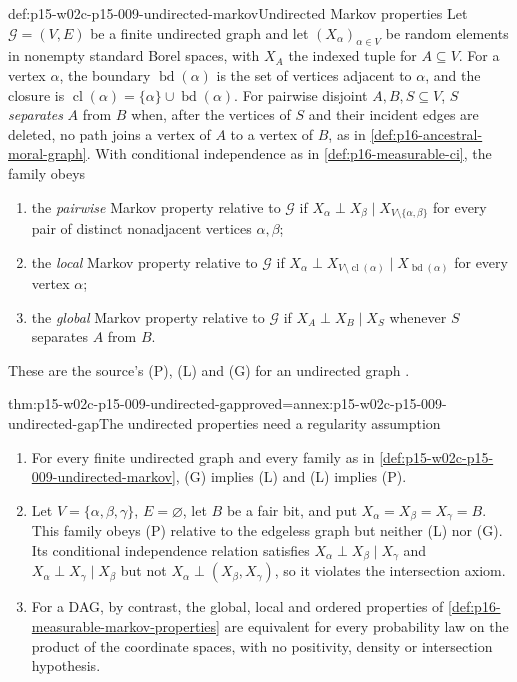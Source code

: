 \begin{hbdefinition}{def:p15-w02c-p15-009-undirected-markov}{Undirected Markov properties}
Let \(\mathcal G=(V,E)\) be a finite undirected graph and let
\((X_\alpha)_{\alpha\in V}\) be random elements in nonempty standard
Borel spaces, with \(X_A\) the indexed tuple for \(A\subseteq V\). For a
vertex \(\alpha\), the boundary \(\operatorname{bd}(\alpha)\) is the set
of vertices adjacent to \(\alpha\), and the closure is
\(\operatorname{cl}(\alpha)=\{\alpha\}\cup\operatorname{bd}(\alpha)\).
For pairwise disjoint \(A,B,S\subseteq V\), \(S\) \emph{separates}
\(A\) from \(B\) when, after the vertices of \(S\) and their incident
edges are deleted, no path joins a vertex of \(A\) to a vertex of \(B\),
as in \cref{def:p16-ancestral-moral-graph}. With conditional independence
as in \cref{def:p16-measurable-ci}, the family obeys
\begin{enumerate}
\item[(P)] the \emph{pairwise} Markov property relative to \(\mathcal G\)
  if \(X_\alpha\perp X_\beta\mid X_{V\setminus\{\alpha,\beta\}}\) for every
  pair of distinct nonadjacent vertices \(\alpha,\beta\);
\item[(L)] the \emph{local} Markov property relative to \(\mathcal G\) if
  \(X_\alpha\perp X_{V\setminus\operatorname{cl}(\alpha)}
  \mid X_{\operatorname{bd}(\alpha)}\) for every vertex \(\alpha\);
\item[(G)] the \emph{global} Markov property relative to \(\mathcal G\) if
  \(X_A\perp X_B\mid X_S\) whenever \(S\) separates \(A\) from \(B\).
\end{enumerate}
These are the source's (P), (L) and (G) for an undirected graph
\cite[Definition~2.35, p.~59; p.~60]{Lauritzen2019GraphicalLectures2020}.
\end{hbdefinition}

\begin{hbtheorem}{thm:p15-w02c-p15-009-undirected-gap}{proved=annex:p15-w02c-p15-009-undirected-gap}{The undirected properties need a regularity assumption}
\begin{enumerate}
\item For every finite undirected graph and every family as in
  \cref{def:p15-w02c-p15-009-undirected-markov}, (G) implies (L) and (L)
  implies (P).
\item Let \(V=\{\alpha,\beta,\gamma\}\), \(E=\varnothing\), let \(B\) be
  a fair bit, and put \(X_\alpha=X_\beta=X_\gamma=B\). This family obeys
  (P) relative to the edgeless graph but neither (L) nor (G). Its
  conditional independence relation satisfies
  \(X_\alpha\perp X_\beta\mid X_\gamma\) and
  \(X_\alpha\perp X_\gamma\mid X_\beta\) but not
  \(X_\alpha\perp(X_\beta,X_\gamma)\), so it violates the intersection
  axiom.
\item For a DAG, by contrast, the global, local and ordered properties of
  \cref{def:p16-measurable-markov-properties} are equivalent for every
  probability law on the product of the coordinate spaces, with no
  positivity, density or intersection hypothesis.
\end{enumerate}
\end{hbtheorem}


